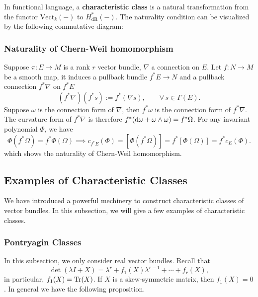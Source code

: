In functional language, a \textbf{characteristic class} is a natural transformation from 
the functor $\mathrm{Vect}_k(-)$ to $H_{\mathrm{dR}}^{*}(-)$. 
The naturality condition can be visualized by the following commutative diagram: 
\begin{center}
\end{center}

\subsubsection*{Naturality of Chern-Weil homomorphism}
Suppose $\pi:E\to M$ is a rank $r$ vector bundle, $\nabla$ a connection on $E$.
Let $f:N\to M$ be a smooth map, it induces a pullback bundle $f^*E\to N$ and a pullback connection $f^*\nabla$ on $f^*E$ 
\begin{equation*}
    (f^*\nabla)(f^*s) := f^*(\nabla s), \qquad \forall\, s\in\Gamma(E).
\end{equation*}
Suppose $\omega$ is the connection form of $\nabla$, then $f^*\omega$ is the connection form of $f^*\nabla$.
The curvature form of $f^*\nabla$ is therefore $f^*({\rm d}\omega + \omega\wedge\omega) = f^*\Omega$.
For any invariant polynomial $\Phi$, we have
\begin{equation*}
    \Phi(f^*\Omega) = f^*\Phi(\Omega) \implies
    c_{f^*E}(\Phi) = [\Phi(f^*\Omega)] = f^*[\Phi(\Omega)] = f^*c_E(\Phi).
\end{equation*}
which shows the naturality of Chern-Weil homomorphism.

\subsection{Examples of Characteristic Classes}
We have introduced a powerful mechinery to construct characteristic classes of vector bundles. 
In this subsection, we will give a few examples of characteristic classes. 

\subsubsection{Pontryagin Classes}
In this subsection, we only consider real vector bundles. 
Recall that 
\begin{equation*}
    \det(\lambda I + X) = \lambda^r + f_1(X)\lambda^{r-1} + \cdots + f_r(X),
\end{equation*}
in particular, $f_1(X) = {\rm Tr}(X)$. If $X$ is a skew-symmetric matrix, then $f_1(X) = 0$. 
In general we have the following proposition.

